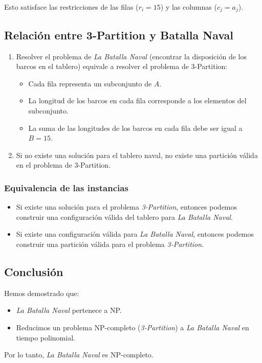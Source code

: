 Esto satisface las restricciones de las filas ($r_i = 15$) y las columnas ($c_j = a_j$).

\subsection*{Relación entre 3-Partition y Batalla Naval}

\begin{enumerate}
    \item Resolver el problema de \textit{La Batalla Naval} (encontrar la disposición de los barcos en el tablero) equivale a resolver el problema de 3-Partition:
    \begin{itemize}
        \item Cada fila representa un subconjunto de $A$.
        \item La longitud de los barcos en cada fila corresponde a los elementos del subconjunto.
        \item La suma de las longitudes de los barcos en cada fila debe ser igual a $B = 15$.
    \end{itemize}

    \item Si no existe una solución para el tablero naval, no existe una partición válida en el problema de 3-Partition.
\end{enumerate}


\subsubsection*{Equivalencia de las instancias}

\begin{itemize}
    \item Si existe una solución para el problema \textit{3-Partition}, entonces podemos construir una configuración válida del tablero para \textit{La Batalla Naval}.
    \item Si existe una configuración válida para \textit{La Batalla Naval}, entonces podemos construir una partición válida para el problema \textit{3-Partition}.
\end{itemize}

\subsection*{Conclusión}

Hemos demostrado que:
\begin{itemize}
    \item \textit{La Batalla Naval} pertenece a NP.
    \item Reducimos un problema NP-completo (\textit{3-Partition}) a \textit{La Batalla Naval} en tiempo polinomial.
\end{itemize}

Por lo tanto, \textit{La Batalla Naval} es NP-completo.